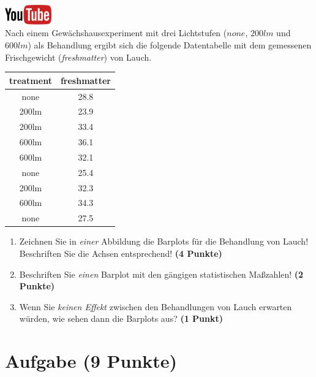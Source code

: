 \documentclass[a4paper, 10pt]{scrartcl}\usepackage[]{graphicx}\usepackage[]{xcolor}
\begin{document}
\hfill\href{https://youtu.be/vXnLttRL_VI}{\includegraphics[width =
  2cm]{img/youtube}}\\[1Ex]



Nach einem Gew{\"a}chshausexperiment mit drei Lichtstufen ($none$, $200lm$ und $600lm$) als Behandlung 
ergibt sich die folgende Datentabelle mit dem gemessenen Frischgewicht
(\textit{freshmatter}) von Lauch.

\begin{table}[!h]
\centering
\begin{tabular}{cc}
\toprule
treatment & freshmatter\\
\midrule
none & 28.8\\
200lm & 23.9\\
200lm & 33.4\\
600lm & 36.1\\
600lm & 32.1\\
\addlinespace
none & 25.4\\
200lm & 32.3\\
600lm & 34.3\\
none & 27.5\\
\bottomrule
\end{tabular}
\end{table}



\begin{enumerate}
\item Zeichnen Sie in \textit{einer} Abbildung die Barplots f{\"u}r die
  Behandlung von Lauch! Beschriften Sie die Achsen entsprechend!
  \textbf{(4 Punkte)}
\item Beschriften Sie \textit{einen} Barplot mit den g{\"a}ngigen
  statistischen Ma{\ss}zahlen! \textbf{(2 Punkte)}
\item Wenn Sie \textit{keinen Effekt} zwischen den Behandlungen von
  Lauch erwarten w{\"u}rden, wie sehen dann die Barplots aus?
  \textbf{(1 Punkt)}
\end{enumerate} 
\clearpage

\section{Aufgabe \hfill (9 Punkte)}
\end{document}
